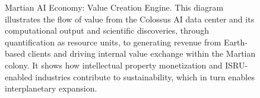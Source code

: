 \documentclass[fontsize=10pt, oneside, DIV=calc]{scrartcl}
\begin{document}
\begin{figure}[H]
  \centering
  \noindent
  \begin{minipage}{\textwidth}
    \centering
    \caption{Martian AI Economy: Value Creation Engine. This diagram illustrates the flow of value from the Colossus AI data center and its computational output and scientific discoveries, through quantification as resource units, to generating revenue from Earth-based clients and driving internal value exchange within the Martian colony. It shows how intellectual property monetization and ISRU-enabled industries contribute to sustainability, which in turn enables interplanetary expansion.}
  \end{minipage}
\end{figure}

\begin{comment}
@startuml
!theme mars
scale 1.6

skinparam defaultFontColor black
skinparam backgroundColor white



title ``Martian AI Economy:\nValue Creation Engine''

skinparam rectangle {
  BorderColor black
  BackgroundColor #ADD8E6
  FontSize 12
  FontColor black
}
skinparam arrow {
  Color black
}


rectangle ``Colossus AI'' as AI

rectangle ``AI Output:\nCompute &\nDiscoveries'' as Output

rectangle ``Quantified\nResource Units'' as Units

rectangle ``Earth Clients\n(Revenue)'' as EarthRev

rectangle ``Martian Colony\n(Internal Value)'' as ColonyValue

rectangle ``IP Monetization'' as IP

rectangle ``ISRU Industries'' as ISRU

rectangle ``Martian\nSustainability'' as Sustain

rectangle ``Interplanetary\nExpansion'' as Expansion


AI -down-> Output : ``Generates''
Output -down-> Units : ``Quantified as''

Units -down-> EarthRev : ``Sold to''
Units -down-> ColonyValue : ``Used by''

EarthRev -down-> Sustain : ``Funds''
ColonyValue -down-> Sustain : ``Contributes to''
IP -down-> Sustain : ``Adds to''
ISRU -down-> Sustain : ``Adds to''

Sustain -down-> Expansion : ``Enables''


@enduml
\end{comment}
\end{document}
